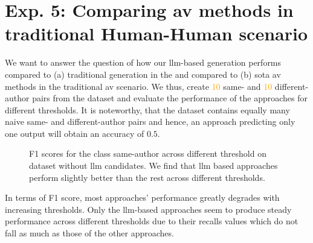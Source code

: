 \section{Exp. 5: Comparing \acs{av} methods in traditional Human-Human scenario}

We want to answer the question of how our \ac{llm}-based \imp{} generation performs compared to (a) traditional \imp{} generation in the \impAppr{} and compared to (b) \acl{sota} \ac{av} methods in the traditional \ac{av} scenario.
We thus, create \textcolor{orange}{10} same- and \textcolor{orange}{10} different-author pairs from the \dataStudent{} dataset and evaluate the performance of the approaches for different thresholds.
It is noteworthy, that the dataset contains equally many naive same- and different-author pairs and hence, an approach predicting only one output will obtain an accuracy of $0.5$.

%     

\begin{figure}[htbp]
\centering
    
  \caption{F1 scores for the class same-author across different threshold on \dataStudent{} dataset without \ac{llm} candidates. 
  We find that \ac{llm} based approaches perform slightly better than the rest across different thresholds.
  }
  \label{fig:human-human_f1}
\end{figure}


In terms of F1 score, most approaches' performance greatly degrades with increasing thresholds.
Only the \ac{llm}-based approaches seem to produce steady performance across different thresholds due to their recalls values which do not fall as much as those of the other approaches.


